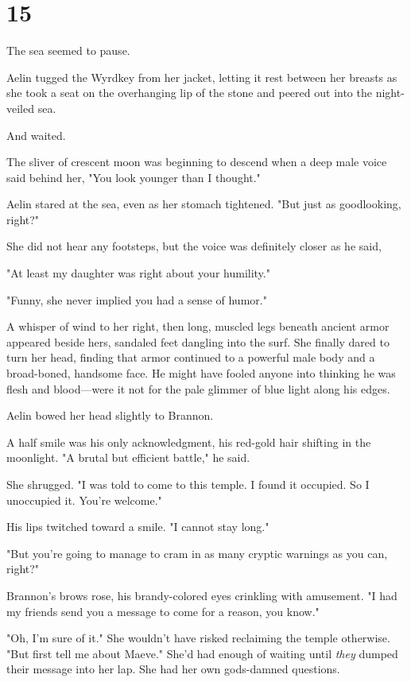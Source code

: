 
\chapter{15}

The sea seemed to pause.

Aelin tugged the Wyrdkey from her jacket, letting it rest between her breasts as she took a seat on the overhanging lip of the stone and peered out into the night-veiled sea.

And waited.

The sliver of crescent moon was beginning to descend when a deep male voice said behind her, "You look younger than I thought."

Aelin stared at the sea, even as her stomach tightened.
"But just as goodlooking, right?"

She did not hear any footsteps, but the voice was definitely closer as he said,

"At least my daughter was right about your humility."

"Funny, she never implied you had a sense of humor."

A whisper of wind to her right, then long, muscled legs beneath ancient armor appeared beside hers, sandaled feet dangling into the surf.
She finally dared to turn her head, finding that armor continued to a powerful male body and a broad-boned, handsome face.
He might have fooled anyone into thinking he was flesh and blood---were it not for the pale glimmer of blue light along his edges.

Aelin bowed her head slightly to Brannon.

A half smile was his only acknowledgment, his red-gold hair shifting in the moonlight.
"A brutal but efficient battle," he said.

She shrugged.
"I was told to come to this temple.
I found it occupied.
So I unoccupied it.
You're welcome."

His lips twitched toward a smile.
"I cannot stay long."

"But you're going to manage to cram in as many cryptic warnings as you can, right?"

Brannon's brows rose, his brandy-colored eyes crinkling with amusement.
"I had my friends send you a message to come for a reason, you know."

"Oh, I'm sure of it."
She wouldn't have risked reclaiming the temple otherwise.
"But first tell me about Maeve."
She'd had enough of waiting until \emph{they} dumped their message into her lap.
She had her own gods-damned questions.

